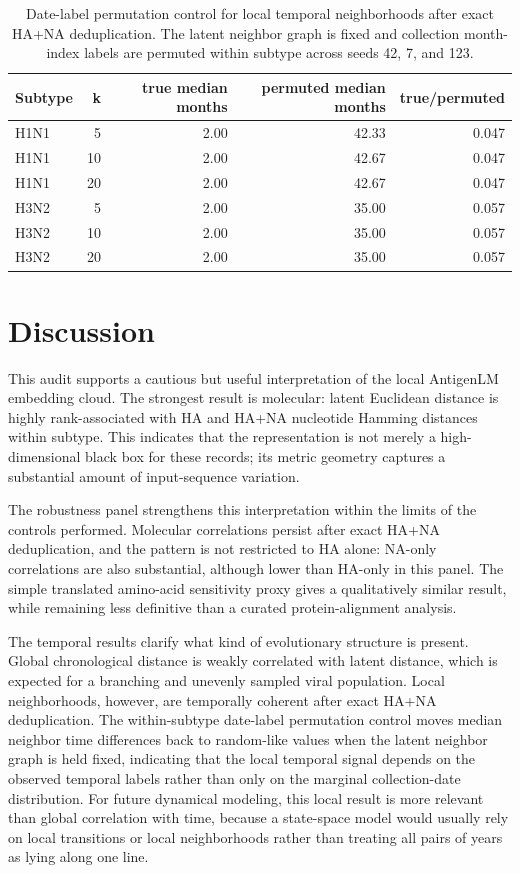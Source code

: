 \documentclass[11pt]{article}
\begin{document}
\begin{table}[H]
\centering
\caption{Date-label permutation control for local temporal neighborhoods after exact HA+NA deduplication. The latent neighbor graph is fixed and collection month-index labels are permuted within subtype across seeds 42, 7, and 123.}
\label{tab:temporal-permutation}
\begin{tabular}{lrrrr}
\toprule
Subtype & k & true median months & permuted median months & true/permuted \\
\midrule
H1N1 & 5 & 2.00 & 42.33 & 0.047 \\
H1N1 & 10 & 2.00 & 42.67 & 0.047 \\
H1N1 & 20 & 2.00 & 42.67 & 0.047 \\
H3N2 & 5 & 2.00 & 35.00 & 0.057 \\
H3N2 & 10 & 2.00 & 35.00 & 0.057 \\
H3N2 & 20 & 2.00 & 35.00 & 0.057 \\
\bottomrule
\end{tabular}
\end{table}

\section{Discussion}

This audit supports a cautious but useful interpretation of the local AntigenLM embedding cloud. The strongest result is molecular: latent Euclidean distance is highly rank-associated with HA and HA+NA nucleotide Hamming distances within subtype. This indicates that the representation is not merely a high-dimensional black box for these records; its metric geometry captures a substantial amount of input-sequence variation.

The robustness panel strengthens this interpretation within the limits of the controls performed. Molecular correlations persist after exact HA+NA deduplication, and the pattern is not restricted to HA alone: NA-only correlations are also substantial, although lower than HA-only in this panel. The simple translated amino-acid sensitivity proxy gives a qualitatively similar result, while remaining less definitive than a curated protein-alignment analysis.

The temporal results clarify what kind of evolutionary structure is present. Global chronological distance is weakly correlated with latent distance, which is expected for a branching and unevenly sampled viral population. Local neighborhoods, however, are temporally coherent after exact HA+NA deduplication. The within-subtype date-label permutation control moves median neighbor time differences back to random-like values when the latent neighbor graph is held fixed, indicating that the local temporal signal depends on the observed temporal labels rather than only on the marginal collection-date distribution. For future dynamical modeling, this local result is more relevant than global correlation with time, because a state-space model would usually rely on local transitions or local neighborhoods rather than treating all pairs of years as lying along one line.
\end{document}
